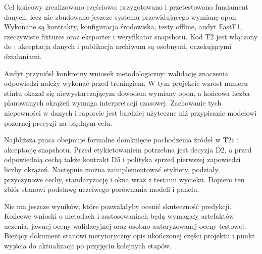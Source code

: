 \label{ch:conclusions}

Cel końcowy zrealizowano częściowo: przygotowano i przetestowano
fundament danych, lecz nie zbudowano jeszcze systemu przewidującego
wymianę opon. Wykonane są kontrakty, konfiguracja środowiska, testy
offline, audyt FastF1, rzeczywiste fixtures oraz eksporter i weryfikator
snapshotu. Kod T2 jest włączony do ; akceptacja danych
i publikacja archiwum są osobnymi, oczekującymi działaniami.

Audyt przyniósł konkretny wniosek metodologiczny: walidację znaczenia
odpowiedzi należy wykonać przed treningiem. W tym projekcie wzrost
numeru stintu okazał się niewystarczającym dowodem wymiany opon,
a końcowa liczba planowanych okrążeń wymaga interpretacji czasowej.
Zachowanie tych niepewności w danych i raporcie jest bardziej użyteczne
niż przypisanie modelowi pozornej precyzji na błędnym celu.

Najbliższa praca obejmuje formalne domknięcie pochodzenia źródeł w T2c
i akceptację snapshotu. Przed etykietowaniem potrzebna jest decyzja D2,
a przed odpowiednią cechą także kontrakt D5 i polityka sprzed pierwszej
zapowiedzi liczby okrążeń. Następnie można zaimplementować etykiety,
podziały, przyczynowe cechy, standaryzację i okna wraz z testami wycieku.
Dopiero ten zbiór stanowi podstawę uczciwego porównania modeli i panelu.

Nie ma jeszcze wyników, które pozwalałyby ocenić skuteczność predykcji.
Końcowe wnioski o metodach i zastosowaniach będą wymagały artefaktów
uczenia, jawnej oceny walidacyjnej oraz osobno autoryzowanej oceny
testowej. Bieżący dokument stanowi merytoryczny opis ukończonej części
projektu i punkt wyjścia do aktualizacji po przyjęciu kolejnych etapów.
